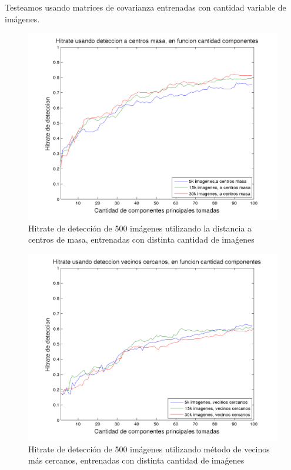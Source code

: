 Testeamos usando matrices de covarianza entrenadas con cantidad variable de im\'agenes.
\def \hrwidth {500pt}

\begin{figure}[H]
\begin {center}
\includegraphics[width=\hrwidth]{plots/HR_N2.png}
\end {center}
\caption{Hitrate de detecci\'on de 500 im\'agenes utilizando la distancia a
centros de masa, entrenadas con distinta cantidad de ima\'genes}
\label{fig:HRN2}
\end{figure}

\begin{figure}[H]
\begin {center}
\includegraphics[width=\hrwidth]{plots/HR_VEC.png}
\end {center}
\caption{Hitrate de detecci\'on de 500 im\'agenes utilizando m\'etodo de
vecinos m\'as cercanos, entrenadas con distinta cantidad de ima\'genes}
\label{fig:HRVEC}
\end{figure}

